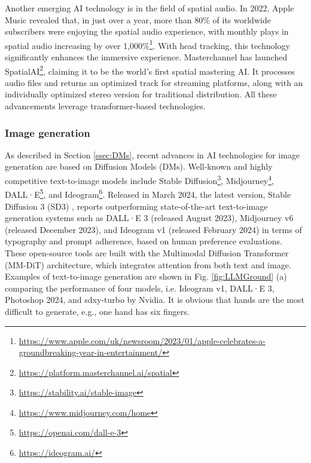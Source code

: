 \documentclass[11pt,a4paper]{article}
\begin{document}
Another emerging AI technology is in the field of spatial audio. In 2022, Apple Music revealed that, in just over a year, more than 80\% of its worldwide subscribers were enjoying the spatial audio experience, with monthly plays in spatial audio increasing by over 1,000\%\footnote{\url{https://www.apple.com/uk/newsroom/2023/01/apple-celebrates-a-groundbreaking-year-in-entertainment/}}. With head tracking, this technology significantly enhances the immersive experience. Masterchannel has launched SpatialAI\footnote{\url{https://platform.masterchannel.ai/spatial}}, claiming it to be the world's first spatial mastering AI. It processes audio files and returns an optimized track for streaming platforms, along with an individually optimized stereo version for traditional distribution. All these advancements leverage transformer-based technologies.

\subsubsection{Image generation}

As described in Section \ref{ssec:DMs}, recent advances in AI technologies for image generation are based on Diffusion Models (DMs). Well-known and highly competitive text-to-image models include Stable Diffusion\footnote{\url{https://stability.ai/stable-image}}, Midjourney\footnote{\url{https://www.midjourney.com/home}}, DALL·E\footnote{\url{https://openai.com/dall-e-3}}, and Ideogram\footnote{\url{https://ideogram.ai/}}. Released in March 2024, the latest version, Stable Diffusion 3 (SD3) \cite{esser:scaling:2024}, reports outperforming state-of-the-art text-to-image generation systems such as DALL·E 3 (released August 2023), Midjourney v6 (released December 2023), and Ideogram v1 (released February 2024) in terms of typography and prompt adherence, based on human preference evaluations. These open-source tools are built with the Multimodal Diffusion Transformer (MM-DiT) architecture, which integrates attention from both text and image. Examples of text-to-image generation are shown in Fig. \ref{fig:LLMGround} (a) comparing the performance of four models, i.e. Ideogram v1, DALL·E 3, Photoshop 2024, and sdxy-turbo by Nvidia. It is obvious that hands are the most difficult to generate, e.g., one hand has six fingers.
\end{document}
